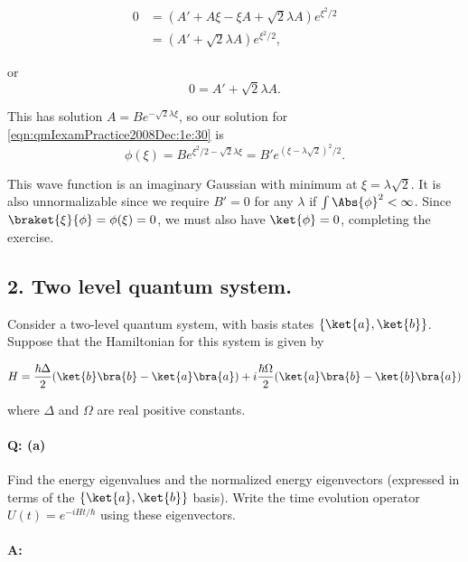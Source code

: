 \begin{align*}
0 &= (A' + A \xi -\xi A + \sqrt{2} \lambda A ) e^{\xi^2/2} \\
&= (A' + \sqrt{2} \lambda A ) e^{\xi^2/2},
\end{align*}

or
\begin{equation}\label{eqn:qmIexamPractice2008Dec:1e:60}
0 = A' + \sqrt{2} \lambda A.
\end{equation}

This has solution $A = B e^{-\sqrt{2} \lambda \xi}$, so our solution for \ref{eqn:qmIexamPractice2008Dec:1e:30} is
\begin{equation}\label{eqn:qmIexamPractice2008Dec:1e:70}
\phi(\xi) = B e^{\xi^2/2 - \sqrt{2} \lambda \xi} 
= B' e^{ (\xi - \lambda \sqrt{2} )^2/2}.
\end{equation}

This wave function is an imaginary Gaussian with minimum at $\xi = \lambda\sqrt{2}$.  It is also unnormalizable since we require $B' = 0$ for any $\lambda$ if $\int \Abs{\phi}^2 < \infty$.  Since $\braket{\xi}{\phi} = \phi(\xi) = 0$, we must also have $\ket{\phi} = 0$, completing the exercise.

\subsection{2.  Two level quantum system.}

Consider a two-level quantum system, with basis states $\{\ket{a}, \ket{b}\}$.  Suppose that the Hamiltonian for this system is given by

\begin{equation}\label{eqn:qmIexamPractice2008Dec:2:10}
H = 
\frac{\hbar \Delta}{2} ( 
\ket{b}\bra{b}
- \ket{a}\bra{a}
)
+ i \frac{\hbar \Omega}{2} ( 
\ket{a}\bra{b}
- \ket{b}\bra{a}
)
\end{equation}

where $\Delta$ and $\Omega$ are real positive constants.

\paragraph{Q: (a)} Find the energy eigenvalues and the normalized energy eigenvectors (expressed in terms of the $\{\ket{a}, \ket{b}\}$ basis).  Write the time evolution operator $U(t) = e^{-i H t/\hbar}$ using these eigenvectors.

\paragraph{A:}


